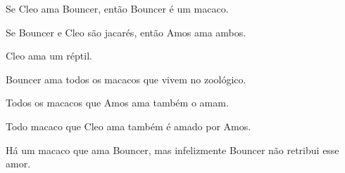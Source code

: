 \begin{compactlist}
\item Se Cleo ama Bouncer, então Bouncer é um macaco.
\item[] 
\item Se Bouncer e Cleo são jacarés, então Amos ama ambos.
\item[] 
\item Cleo ama um réptil.
\item[] 
\item Bouncer ama todos os macacos que vivem no zoológico.
\item[] \item Todos os macacos que Amos ama também o amam.
\item[] 
\item Todo macaco que Cleo ama também é amado por Amos.
\item[] 
\item Há um macaco que ama Bouncer, mas infelizmente Bouncer não retribui esse amor.
\item[] 
\end{compactlist}

